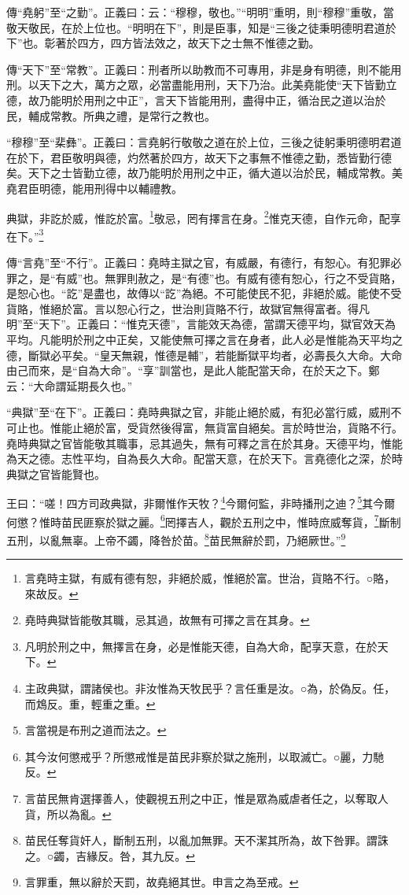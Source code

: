 {\noindent\zhuan{}\fzbyks 傳“堯躬”至“之勤”。正義曰：云：“穆穆，敬也。”“明明”重明，則“穆穆”重敬，當敬天敬民，在於上位也。“明明在下”，則是臣事，知是“三後之徒秉明德明君道於下”也。彰著於四方，四方皆法效之，故天下之士無不惟德之勤。 \par}

{\noindent\zhuan{}\fzbyks 傳“天下”至“常教”。正義曰：刑者所以助教而不可專用，非是身有明德，則不能用刑。以天下之大，萬方之眾，必當盡能用刑，天下乃治。此美堯能使“天下皆勤立德，故乃能明於用刑之中正”，言天下皆能用刑，盡得中正，循治民之道以治於民，輔成常教。所典之禮，是常行之教也。 \par}

{\noindent\shu{}\fzkt “穆穆”至“棐彝”。正義曰：言堯躬行敬敬之道在於上位，三後之徒躬秉明德明君道在於下，君臣敬明與德，灼然著於四方，故天下之事無不惟德之勤，悉皆勤行德矣。天下之士皆勤立德，故乃能明於用刑之中正，循大道以治於民，輔成常教。美堯君臣明德，能用刑得中以輔禮教。 \par}

典獄，非訖於威，惟訖於富。\footnote{言堯時主獄，有威有德有恕，非絕於威，惟絕於富。世治，貨賂不行。○賂，來故反。}敬忌，罔有擇言在身。\footnote{堯時典獄皆能敬其職，忌其過，故無有可擇之言在其身。}惟克天德，自作元命，配享在下。”\footnote{凡明於刑之中，無擇言在身，必是惟能天德，自為大命，配享天意，在於天下。}


{\noindent\zhuan{}\fzbyks 傳“言堯”至“不行”。正義曰：堯時主獄之官，有威嚴，有德行，有恕心。有犯罪必罪之，是“有威”也。無罪則赦之，是“有德”也。有威有德有恕心，行之不受貨賂，是恕心也。“訖”是盡也，故傳以“訖”為絕。不可能使民不犯，非絕於威。能使不受貨賂，惟絕於富。言以恕心行之，世治則貨賂不行，故獄官無得富者。得凡明”至“天下”。正義曰：“惟克天德”，言能效天為德，當謂天德平均，獄官效天為平均。凡能明於刑之中正矣，又能使無可擇之言在身者，此人必是惟能為天平均之德，斷獄必平矣。“皇天無親，惟德是輔”，若能斷獄平均者，必壽長久大命。大命由己而來，是“自為大命”。“享”訓當也，是此人能配當天命，在於天之下。鄭云：“大命謂延期長久也。” \par}

{\noindent\shu{}\fzkt “典獄”至“在下”。正義曰：堯時典獄之官，非能止絕於威，有犯必當行威，威刑不可止也。惟能止絕於富，受貨然後得富，無貨富自絕矣。言於時世治，貨賂不行。堯時典獄之官皆能敬其職事，忌其過失，無有可釋之言在於其身。天德平均，惟能為天之德。志性平均，自為長久大命。配當天意，在於天下。言堯德化之深，於時典獄之官皆能賢也。 \par}

王曰：“嗟！四方司政典獄，非爾惟作天牧？\footnote{主政典獄，謂諸侯也。非汝惟為天牧民乎？言任重是汝。○為，於偽反。任，而鴆反。重，輕重之重。}今爾何監，非時播刑之迪？\footnote{言當視是布刑之道而法之。}其今爾何懲？惟時苗民匪察於獄之麗。\footnote{其今汝何懲戒乎？所懲戒惟是苗民非察於獄之施刑，以取滅亡。○麗，力馳反。}罔擇吉人，觀於五刑之中，惟時庶威奪貨，\footnote{言苗民無肯選擇善人，使觀視五刑之中正，惟是眾為威虐者任之，以奪取人貨，所以為亂。}斷制五刑，以亂無辜。上帝不蠲，降咎於苗。\footnote{苗民任奪貨奸人，斷制五刑，以亂加無罪。天不潔其所為，故下咎罪。謂誅之。○蠲，吉緣反。咎，其九反。}苗民無辭於罰，乃絕厥世。”\footnote{言罪重，無以辭於天罰，故堯絕其世。申言之為至戒。}


